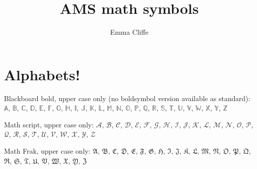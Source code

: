 \documentclass[12pt,a4paper,onecolumn]{article}
\title{AMS math symbols}
\author{Emma Cliffe}
\date{}
\begin{document}
\maketitle

\section{Alphabets!}

\noindent 
Blackboard bold, upper case only (no boldsymbol version available as standard):
\(\mathbb{A}\), \(\mathbb{B}\), \(\mathbb{C}\), \(\mathbb{D}\), \(\mathbb{E}\), \(\mathbb{F}\), \(\mathbb{G}\), \(\mathbb{H}\), \(\mathbb{I}\), \(\mathbb{J}\), \(\mathbb{K}\), \(\mathbb{L}\), \(\mathbb{M}\), \(\mathbb{N}\), \(\mathbb{O}\), \(\mathbb{P}\), \(\mathbb{Q}\), \(\mathbb{R}\), \(\mathbb{S}\), \(\mathbb{T}\), \(\mathbb{U}\), \(\mathbb{V}\), \(\mathbb{W}\), \(\mathbb{X}\), \(\mathbb{Y}\), \(\mathbb{Z}\)

\bigskip

\noindent
Math script, upper case only:
\(\mathscr{A}\), \(\mathscr{B}\), \(\mathscr{C}\), \(\mathscr{D}\), \(\mathscr{E}\), \(\mathscr{F}\), \(\mathscr{G}\), \(\mathscr{H}\), \(\mathscr{I}\), \(\mathscr{J}\), \(\mathscr{K}\), \(\mathscr{L}\), \(\mathscr{M}\), \(\mathscr{N}\), \(\mathscr{O}\), \(\mathscr{P}\), \(\mathscr{Q}\), \(\mathscr{R}\), \(\mathscr{S}\), \(\mathscr{T}\), \(\mathscr{U}\), \(\mathscr{V}\), \(\mathscr{W}\), \(\mathscr{X}\), \(\mathscr{Y}\), \(\mathscr{Z}\)

\bigskip

\noindent
Math Frak, upper case only:
\(\mathfrak{A}\), \(\mathfrak{B}\), \(\mathfrak{C}\), \(\mathfrak{D}\), \(\mathfrak{E}\), \(\mathfrak{F}\), \(\mathfrak{G}\), \(\mathfrak{H}\), \(\mathfrak{I}\), \(\mathfrak{J}\), \(\mathfrak{K}\), \(\mathfrak{L}\), \(\mathfrak{M}\), \(\mathfrak{N}\), \(\mathfrak{O}\), \(\mathfrak{P}\), \(\mathfrak{Q}\), \(\mathfrak{R}\), \(\mathfrak{S}\), \(\mathfrak{T}\), \(\mathfrak{U}\), \(\mathfrak{V}\), \(\mathfrak{W}\), \(\mathfrak{X}\), \(\mathfrak{Y}\), \(\mathfrak{Z}\)
\end{document}

